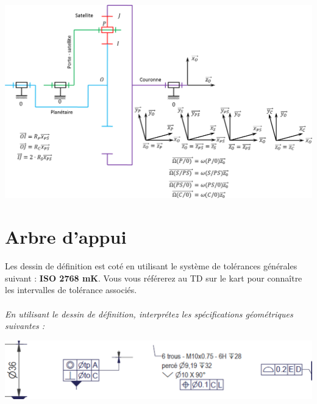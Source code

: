 \documentclass[11pt,oneside]{article}
\begin{document}
\begin{center}
\includegraphics[width=.9\textwidth]{png/epi}
\end{center}


\section{Arbre d'appui}
Les dessin de définition est coté en utilisant le système de tolérances générales suivant : \textbf{ISO 2768 mK}. Vous vous référerez au TD sur le kart pour connaître les intervalles de tolérance associés. 

\paragraph{}
\textit{En utilisant le dessin de définition, interprétez les spécifications géométriques suivantes :}

\begin{center}
\includegraphics[width=.8\textwidth]{png/specif}
\end{center}
\end{document}
